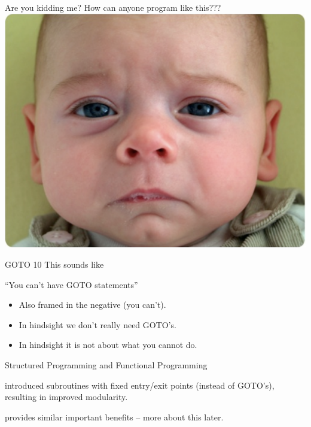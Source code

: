 \documentclass{beamer}
\begin{document}
\begin{frame}{Are you kidding me?}
  How can anyone program like this???
  \includegraphics[scale=0.3]{img/sadbaby.png}
\end{frame}

\begin{frame}{GOTO 10}
    This sounds like
  \begin{exampleblock}{}
    {\Large ``You can't have GOTO statements''}
  \end{exampleblock}
  \vskip5mm
  \hspace*{}

  \begin{itemize}[<+->]
  \item Also framed in the negative (you can't).
  \item In hindsight we don't really need GOTO's.
  \item In hindsight it is not about what you cannot do.
  \end{itemize}
\end{frame}

\begin{frame}{Structured Programming and Functional Programming}
  \begin{description}[<+->]
  \item[Structured Programming] introduced subroutines with fixed
    entry/exit points (instead of GOTO's), resulting in improved
    modularity.
  \item[Functional Programming] provides similar important benefits --
    more about this later.
  \end{description}
\end{frame}
\end{document}

